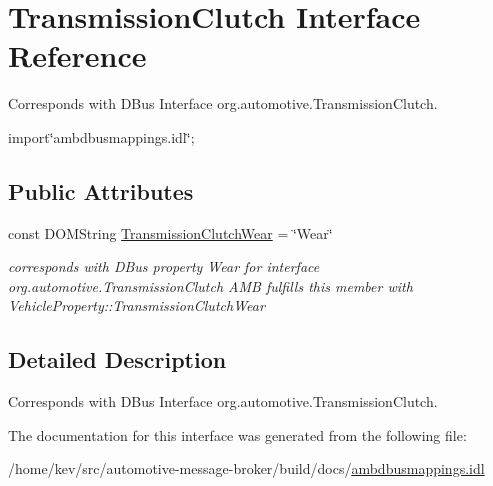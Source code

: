 \hypertarget{interfaceTransmissionClutch}{\section{Transmission\+Clutch Interface Reference}
\label{interfaceTransmissionClutch}
}


Corresponds with D\+Bus Interface org.\+automotive.\+Transmission\+Clutch.  




{\ttfamily import\char`\"{}ambdbusmappings.\+idl\char`\"{};}

\subsection*{Public Attributes}
\begin{DoxyCompactItemize}
\item 
\hypertarget{interfaceTransmissionClutch_ab8645ae72ab9dd0d586c91206e16202f}{const D\+O\+M\+String \hyperlink{interfaceTransmissionClutch_ab8645ae72ab9dd0d586c91206e16202f}{Transmission\+Clutch\+Wear} = \char`\"{}Wear\char`\"{}}\label{interfaceTransmissionClutch_ab8645ae72ab9dd0d586c91206e16202f}

\begin{DoxyCompactList}\small\item\em corresponds with D\+Bus property Wear for interface org.\+automotive.\+Transmission\+Clutch A\+M\+B fulfills this member with Vehicle\+Property\+::\+Transmission\+Clutch\+Wear \end{DoxyCompactList}\end{DoxyCompactItemize}


\subsection{Detailed Description}
Corresponds with D\+Bus Interface org.\+automotive.\+Transmission\+Clutch. 

The documentation for this interface was generated from the following file\+:\begin{DoxyCompactItemize}
\item 
/home/kev/src/automotive-\/message-\/broker/build/docs/\hyperlink{ambdbusmappings_8idl}{ambdbusmappings.\+idl}\end{DoxyCompactItemize}
